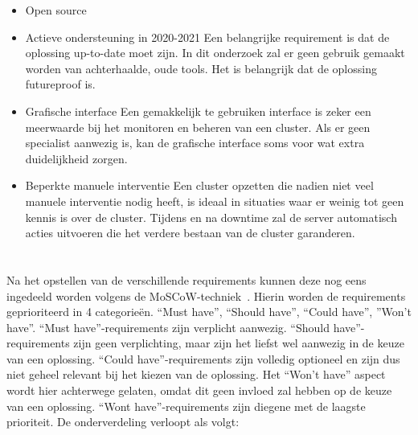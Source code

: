 \begin{itemize}
    \item Open source
    \item Actieve ondersteuning in 2020-2021
    \newline
    Een belangrijke requirement is dat de oplossing up-to-date moet zijn. In dit onderzoek zal er geen gebruik gemaakt worden van achterhaalde, oude tools. Het is belangrijk dat de oplossing futureproof is.
    \item Grafische interface
    \newline
    Een gemakkelijk te gebruiken interface is zeker een meerwaarde bij het monitoren en beheren van een cluster. Als er geen specialist aanwezig is, kan de grafische interface soms voor wat extra duidelijkheid zorgen.
    \item Beperkte manuele interventie
    \newline
    Een cluster opzetten die nadien niet veel manuele interventie nodig heeft, is ideaal in situaties waar er weinig tot geen kennis is over de cluster. Tijdens en na downtime zal de server automatisch acties uitvoeren die het verdere bestaan van de cluster garanderen.
    
\end{itemize}


\section{}
\label{sec:Indelen requirements volgens MoSCoW-techniek}

Na het opstellen van de verschillende requirements kunnen deze nog eens ingedeeld worden volgens de MoSCoW-techniek~\autocite{Ahmad2017}. Hierin worden de requirements geprioriteerd in 4 categorieën. “Must have”, “Should have”, “Could have”, ”Won't have”. “Must have”-requirements zijn verplicht aanwezig. “Should have”-requirements zijn geen verplichting, maar zijn het liefst wel aanwezig in de keuze van een oplossing. “Could have”-requirements zijn volledig optioneel en zijn dus niet geheel relevant bij het kiezen van de oplossing. Het “Won't have” aspect wordt hier achterwege gelaten, omdat dit geen invloed zal hebben op de keuze van een oplossing. “Wont have”-requirements zijn diegene met de laagste prioriteit. De onderverdeling verloopt als volgt:

